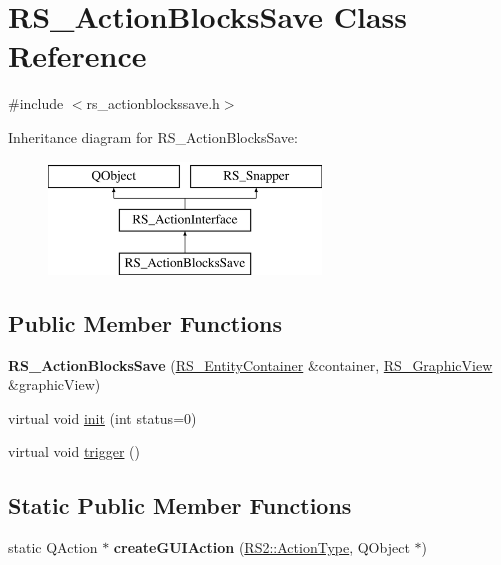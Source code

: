 \hypertarget{classRS__ActionBlocksSave}{\section{R\-S\-\_\-\-Action\-Blocks\-Save Class Reference}
\label{classRS__ActionBlocksSave}
}


{\ttfamily \#include $<$rs\-\_\-actionblockssave.\-h$>$}

Inheritance diagram for R\-S\-\_\-\-Action\-Blocks\-Save\-:\begin{figure}[H]
\begin{center}
\leavevmode
\includegraphics[height=3.000000cm]{classRS__ActionBlocksSave}
\end{center}
\end{figure}
\subsection*{Public Member Functions}
\begin{DoxyCompactItemize}
\item 
\hypertarget{classRS__ActionBlocksSave_a38509a7e4831e6c45c6c5982cebeabc4}{{\bfseries R\-S\-\_\-\-Action\-Blocks\-Save} (\hyperlink{classRS__EntityContainer}{R\-S\-\_\-\-Entity\-Container} \&container, \hyperlink{classRS__GraphicView}{R\-S\-\_\-\-Graphic\-View} \&graphic\-View)}\label{classRS__ActionBlocksSave_a38509a7e4831e6c45c6c5982cebeabc4}

\item 
virtual void \hyperlink{classRS__ActionBlocksSave_a8c91325b91f5aaa343074bc1424a004c}{init} (int status=0)
\item 
virtual void \hyperlink{classRS__ActionBlocksSave_a7af39e9530d1bcd7cc67cd8b94d9fa8d}{trigger} ()
\end{DoxyCompactItemize}
\subsection*{Static Public Member Functions}
\begin{DoxyCompactItemize}
\item 
\hypertarget{classRS__ActionBlocksSave_adbb1344c7475be0e2d186ff4c7068338}{static Q\-Action $\ast$ {\bfseries create\-G\-U\-I\-Action} (\hyperlink{classRS2_afe3523e0bc41fd637b892321cfc4b9d7}{R\-S2\-::\-Action\-Type}, Q\-Object $\ast$)}\label{classRS__ActionBlocksSave_adbb1344c7475be0e2d186ff4c7068338}

\end{DoxyCompactItemize}
